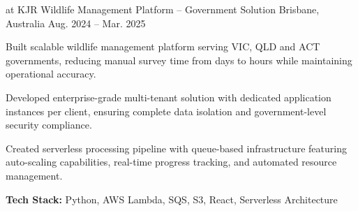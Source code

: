 \begin{cventries}
  \cventry
    {at KJR} %
    {Wildlife Management Platform – Government Solution} %
    {Brisbane, Australia} %
    {Aug. 2024 – Mar. 2025} %
    {
      \begin{cvitems}
        \item {Built scalable wildlife management platform serving VIC, QLD and ACT governments, reducing manual survey time from days to hours while maintaining operational accuracy.}
        \item {Developed enterprise-grade multi-tenant solution with dedicated application instances per client, ensuring complete data isolation and government-level security compliance.}
        \item {Created serverless processing pipeline with queue-based infrastructure featuring auto-scaling capabilities, real-time progress tracking, and automated resource management.}
        \item {\textbf{Tech Stack:} Python, AWS Lambda, SQS, S3, React, Serverless Architecture}
      \end{cvitems}
    }



\end{cventries}
